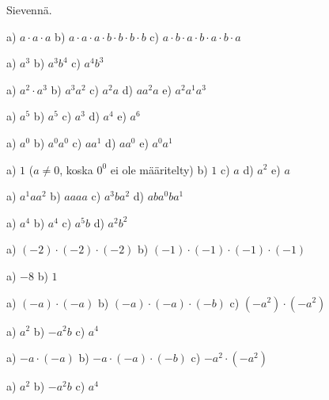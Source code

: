 Sievennä.
\begin{tehtava}
a) $a\cdot a\cdot a$ \quad b) $a\cdot a\cdot a\cdot b\cdot b\cdot b\cdot b$ \quad
c) $a\cdot b\cdot a\cdot b\cdot a\cdot b\cdot a$
\begin{vastaus}
a) $a^3$ \qquad b) $a^3b^4$ \qquad c) $a^4b^3$
\end{vastaus}
\end{tehtava}
\begin{tehtava}
a) $a^2\cdot a^3$ \qquad b) $a^3a^2$ \qquad c) $a^2 a$ \qquad d) $a a^2 a$ \qquad
e) $a^2a^1a^3$
\begin{vastaus}
a) $a^5$ \qquad b) $a^5$ \qquad c) $a^3$ \qquad d) $a^4$ \qquad e) $a^6$
\end{vastaus}
\end{tehtava}
\begin{tehtava}
a) $a^0$ \qquad b) $a^0a^0$ \qquad c) $a a^1$ \qquad d) $aa^0$ \qquad
e) $a^0a^1$
\begin{vastaus}
a) $1$ \quad ($a\neq0$, koska $0^0$ ei ole määritelty) \qquad b) $1$ \qquad c) $a$ \qquad d) $a^2$ \qquad
e) $a$
\end{vastaus}
\end{tehtava}
\begin{tehtava}
a) $a^1 a a^2$ \qquad b) $aaaa$ \qquad c) $a^3ba^2$ \qquad d) $aba^0ba^1$
\begin{vastaus}
a) $ a^4$ \qquad b) $a^4$ \qquad c) $a^5b$ \qquad d) $a^2b^2$
\end{vastaus}
\end{tehtava}
\begin{tehtava}
a) $(-2)\cdot(-2)\cdot(-2)$ \qquad b) $(-1)\cdot(-1)\cdot(-1)\cdot(-1)$
\begin{vastaus}
a) $ -8$ \qquad b) $1$
\end{vastaus}
\end{tehtava}
\begin{tehtava}
a) $(-a)\cdot(-a)$ \qquad b) $(-a)\cdot(-a)\cdot(-b)$ \qquad c) $(-a^2)\cdot(-a^2)$
\begin{vastaus}
a) $a^2$ \qquad b) $-a^2b$ \qquad c) $a^4$
\end{vastaus}
\end{tehtava}
\begin{tehtava}
a) $-a\cdot(-a)$ \qquad b) $-a\cdot(-a)\cdot(-b)$ \qquad c) $-a^2\cdot(-a^2)$
\begin{vastaus}
a) $a^2$ \qquad b) $-a^2b$ \qquad c) $a^4$
\end{vastaus}
\end{tehtava}
